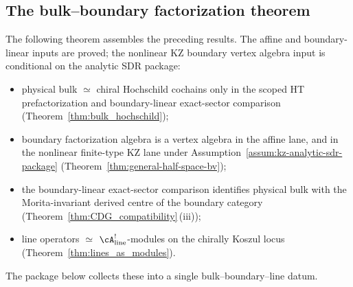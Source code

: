 \subsection{The bulk--boundary factorization theorem}
\label{subsec:bulk-boundary-factorization-theorem}

The following theorem assembles the preceding results. The affine and
boundary-linear inputs are proved; the nonlinear KZ boundary vertex
algebra input is conditional on the analytic SDR package:
\begin{itemize}
\item physical bulk $\simeq$ chiral Hochschild cochains only in the
 scoped HT prefactorization and boundary-linear exact-sector comparison
 (Theorem~\ref{thm:bulk_hochschild});
\item boundary factorization algebra is a vertex algebra in the affine
 lane, and in the nonlinear finite-type KZ lane under
 Assumption~\ref{assum:kz-analytic-sdr-package}
 (Theorem~\ref{thm:general-half-space-bv});
\item the boundary-linear exact-sector comparison identifies physical
 bulk with the Morita-invariant derived centre of the boundary
 category
 (Theorem~\ref{thm:CDG_compatibility}\,(iii));
\item line operators $\simeq$ $\cA^!_{\mathrm{line}}$-modules
 on the chirally Koszul locus
 (Theorem~\ref{thm:lines_as_modules}).
\end{itemize}
The package below collects these into a single bulk--boundary--line datum.

